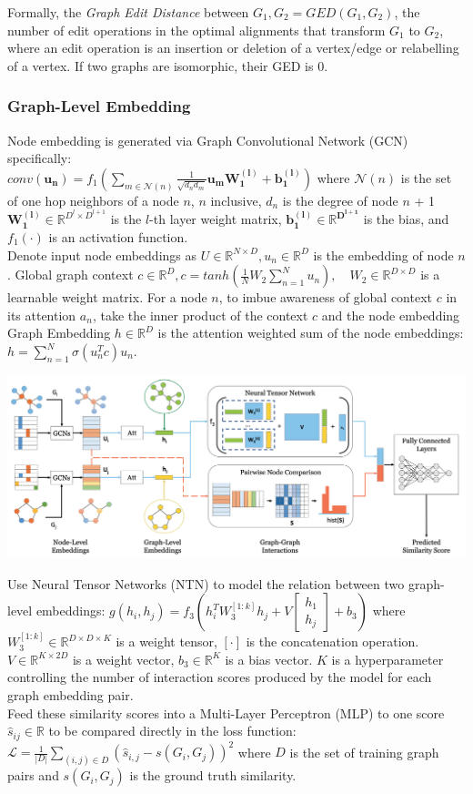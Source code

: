 \documentclass{article}
\begin{document}
Formally, the \textit{Graph Edit Distance} between $G_1, G_2 = GED(G_1, G_2)$, the number of edit operations in the optimal alignments that transform $G_1$ to $G_2$, where an edit operation is an insertion or deletion of a vertex/edge or relabelling of a vertex.
If two graphs are isomorphic, their GED is 0.\\
\subsubsection{Graph-Level Embedding}  Node embedding is generated via Graph Convolutional Network (GCN) specifically:\\ $conv(\mathbf{u_n}) = f_1(\sum_{m \in \mathcal{N}(n)}\frac{1}{\sqrt{d_nd_m}}\mathbf{u_mW_1^{(l)} + b_1^{(l)}})$
where $\mathcal{N}(n)$ is the set of one hop neighbors of a node $n$, $n$ inclusive, $d_n$ is the degree of node $n$ + 1 $\mathbf{W_1^{(l)}} \in \mathbb{R}^{D^l \times D^{l+1}}$ is the $l$-th layer weight matrix, $\mathbf{b_1^{(l)} \in \mathbb{R}^{D^{l+1}}}$ is the bias, and $f_1(\cdot)$ is an activation function.\\
Denote input node embeddings as $U \in \mathbb{R}^{N \times D}, u_n \in \mathbb{R}^D$ is the embedding of node $n$. Global graph context $c \in \mathbb{R}^D, c = tanh(\frac{1}{N}W_2\sum_{n=1}^Nu_n),\quad W_2 \in \mathbb{R}^{D \times D}$ is a learnable weight matrix. For a node $n$, to imbue awareness of global context $c$ in its attention $a_n$, take the inner product of the context $c$ and the node embedding
Graph Embedding $h \in \mathbb{R}^D$ is the attention weighted sum of the node embeddings: $h = \sum_{n=1}^N\sigma(u_n^Tc)u_n$.\\
\centerline{\includegraphics[width=\columnwidth]{Images/Similarity2-1.png}}
Use Neural Tensor Networks (NTN) to model the relation between two graph-level embeddings:
$g(h_i, h_j) = f_3(h_i^TW_3^{[1:k]}h_j + V\begin{bmatrix} h_1 \\ h_j \end{bmatrix} + b_3)$
where $W_3^{[1:k]} \in \mathbb{R}^{D \times D \times K}$ is a weight tensor, $[\cdot]$ is the concatenation operation.
$V \in \mathbb{R}^{K \times 2D}$ is a weight vector, $b_3 \in \mathbb{R}^K$ is a bias vector. $K$ is a hyperparameter controlling the number of interaction scores produced by the model for each graph embedding pair.\\
Feed these similarity scores into a Multi-Layer Perceptron (MLP) to one score $\hat{s}_{ij} \in \mathbb{R}$ to be compared directly in the loss function:
$\mathcal{L} = \frac{1}{|D|} \sum_{(i,j) \in D}(\hat{s}_{i,j} - s(G_i, G_j))^2$
where $D$ is the set of training graph pairs and $s(G_i, G_j)$ is the ground truth similarity.\\
\end{document}
